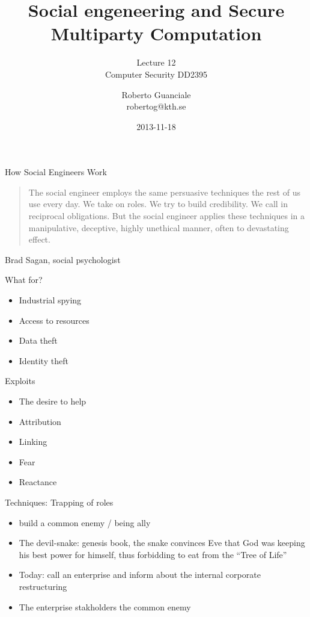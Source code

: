 \documentclass{beamer}
\title{Social engeneering and Secure Multiparty Computation}
\subtitle{Lecture 12 \\ Computer Security DD2395}
\author[R. Guanciale]{
  Roberto Guanciale\\
  robertog@kth.se
}
\date{2013-11-18}
\begin{document}
\begin{frame}[plain]
  \titlepage
\end{frame}


\begin{frame}{How Social Engineers Work}
  
  \begin{quote}
The social engineer employs the same persuasive 
techniques the rest of us use every day. We take 
on roles. We try to build credibility. We call in 
reciprocal obligations. But the social engineer 
applies these techniques in a manipulative, 
deceptive, highly unethical manner, often to 
devastating effect.
  \end{quote}
Brad Sagan, social psychologist
\end{frame}

\begin{frame}{What for?}
  \begin{itemize}
    \item Industrial spying 
    \item Access to resources 
    \item Data theft
    \item Identity theft
  \end{itemize}
\end{frame}
 

\begin{frame}{Exploits}
  \begin{itemize}
    \item The desire to help 
    \item Attribution
    \item Linking
    \item Fear
    \item Reactance
  \end{itemize}
\end{frame}

\begin{frame}{Techniques: Trapping of roles}
  \begin{itemize}
    \item build a common enemy / being ally
    \item The devil-snake: genesis book, the snake convinces Eve that God was
      keeping his best power for himself, thus forbidding to eat from
      the ``Tree of Life''
    \item Today: call an enterprise and inform about the internal
      corporate restructuring
    \item The enterprise stakholders the common enemy 
  \end{itemize}
\end{frame}
\end{document}
